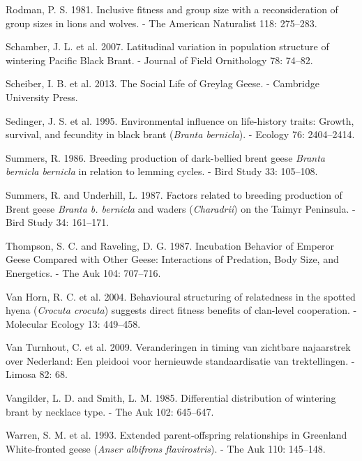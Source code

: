 \documentclass[10pt,twocolumn]{paper}
\begin{document}
\hypertarget{ref-rodman1981lions}{}
Rodman, P. S. 1981. Inclusive fitness and group size with a
reconsideration of group sizes in lions and wolves. - The American
Naturalist 118: 275--283.

\hypertarget{ref-JOFO:JOFO087}{}
Schamber, J. L. et al. 2007. Latitudinal variation in population
structure of wintering Pacific Black Brant. - Journal of Field
Ornithology 78: 74--82.

\hypertarget{ref-scheiber2013social}{}
Scheiber, I. B. et al. 2013. The Social Life of Greylag Geese. -
Cambridge University Press.

\hypertarget{ref-ECY:ECY19957682404}{}
Sedinger, J. S. et al. 1995. Environmental influence on life-history
traits: Growth, survival, and fecundity in black brant (\emph{Branta
bernicla}). - Ecology 76: 2404--2414.

\hypertarget{ref-summers1986breeding}{}
Summers, R. 1986. Breeding production of dark-bellied brent geese
\emph{Branta bernicla bernicla} in relation to lemming cycles. - Bird
Study 33: 105--108.

\hypertarget{ref-summers1987factors}{}
Summers, R. and Underhill, L. 1987. Factors related to breeding
production of Brent geese \emph{Branta b. bernicla} and waders
(\emph{Charadrii}) on the Taimyr Peninsula. - Bird Study 34: 161--171.

\hypertarget{ref-thompson1987emperor}{}
Thompson, S. C. and Raveling, D. G. 1987. Incubation Behavior of Emperor
Geese Compared with Other Geese: Interactions of Predation, Body Size,
and Energetics. - The Auk 104: 707--716.

\hypertarget{ref-MEC:MEC2071}{}
Van Horn, R. C. et al. 2004. Behavioural structuring of relatedness in
the spotted hyena (\emph{Crocuta crocuta}) suggests direct fitness
benefits of clan-level cooperation. - Molecular Ecology 13: 449--458.

\hypertarget{ref-van2009veranderingen}{}
Van Turnhout, C. et al. 2009. Veranderingen in timing van zichtbare
najaarstrek over Nederland: Een pleidooi voor hernieuwde standaardisatie
van trektellingen. - Limosa 82: 68.

\hypertarget{ref-vangilder1985differential}{}
Vangilder, L. D. and Smith, L. M. 1985. Differential distribution of
wintering brant by necklace type. - The Auk 102: 645--647.

\hypertarget{ref-10.2307ux2f4088245}{}
Warren, S. M. et al. 1993. Extended parent-offspring relationships in
Greenland White-fronted geese (\emph{Anser albifrons flavirostris}). -
The Auk 110: 145--148.
\end{document}
